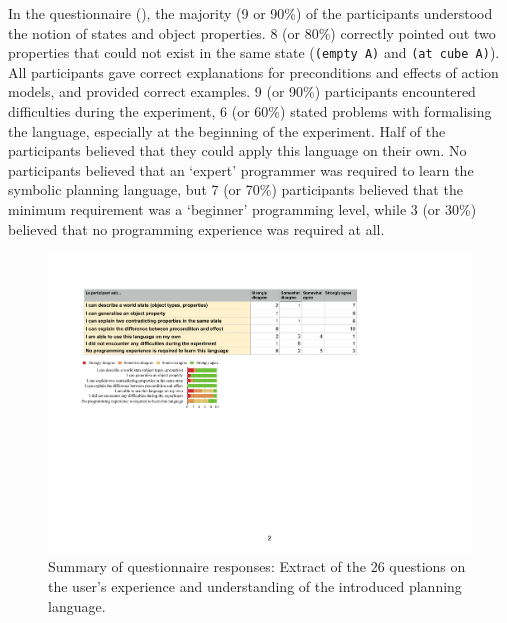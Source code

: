 In the questionnaire (), the majority (9 or 90\%) of the participants understood the notion of states and object properties.
8 (or 80\%) correctly pointed out two properties that could not exist in the same state (\eg \texttt{(empty A)} and \texttt{(at cube A)}).
All participants gave correct explanations for preconditions and effects of action models, and provided correct examples.
9 (or 90\%) participants encountered difficulties during the experiment, 6 (or 60\%) stated problems with formalising the language, especially at the beginning of the experiment.
Half of the participants believed that they could apply this language on their own.
No participants believed that an `expert' programmer was required to learn the symbolic planning language, but 7 (or 70\%) participants believed that the minimum requirement was a `beginner' programming level, while 3 (or 30\%) believed that no programming experience was required at all.


\begin{figure}[ht]
	\centering
	\includegraphics[width=0.85\linewidth]{figures/eEvaluation2}
	\caption{Summary of questionnaire responses: Extract of the 26 questions on the user's experience and understanding of the introduced planning language.}
	\label{fig:eEvaluation2}
\end{figure} 